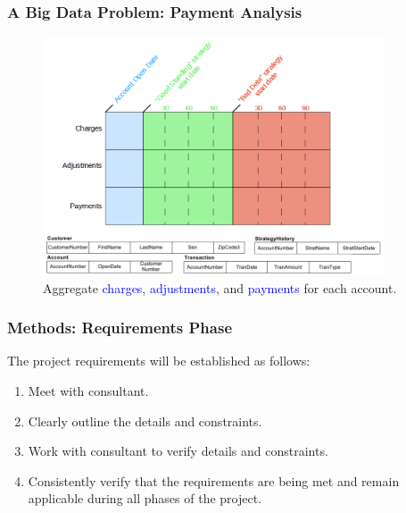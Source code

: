 \documentclass[hyperref={pdfpagelabels=false}]{beamer}
\begin{document}
\begin{frame}

\frametitle{A Big Data Problem: Payment Analysis}
\begin{figure}
\centering
 \includegraphics[width=4.0in,
keepaspectratio=true]{./images/payment-analysis.png}
\caption{Aggregate \textcolor{blue}{charges}, \textcolor{blue}{adjustments}, and
\textcolor{blue}{payments} for each account.}
\end{figure}


\end{frame}

%
%
% 
% 
% 

\begin{frame}
\frametitle{Methods: Requirements Phase}

The project requirements will be established as follows:
\begin{enumerate}
\item Meet with consultant.
\pause
\item Clearly outline the details and constraints.
\pause 
\item Work with consultant to verify details and constraints.
\pause 
\item Consistently verify that the requirements are being met and remain
       applicable during all phases of the project.
\end{enumerate}

\end{frame}
\end{document}
